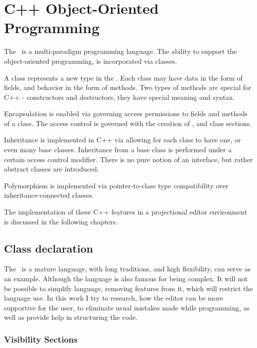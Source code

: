 \chapter{C++ Object-Oriented Programming}

The \cpppl\ is a multi-paradigm programming language. The ability to support the object-oriented programming,
is incorporated via classes. 

A class represents a new type in the \cpppl. Each class may have data in the 
form of fields, and behavior in the form of methods. Two types of methods are special for
C++ - constructors and destructors, they have special meaning and syntax.

Encapsulation is enabled via governing access permissions to fields and methods of a class.
The access control is governed with the creation of ,  and 
class sections.

Inheritance is implemented in C++ via allowing for each class to have one, or even many base classes.
Inheritance from a base class is performed under a certain access control modifier. There is no pure notion 
of an interface, but rather abstract classes are introduced.

Polymorphism is implemented via pointer-to-class type compatibility over inheritance-connected classes.

The implementation of these C++ features in a projectional editor environment is discussed in the
following chapters.


\section{Class declaration}
\label{section:classes}




The \cpppl\ is a mature language, with long traditions, and high flexibility, \cite{alexandrescu} can serve as an example. 
Although the language is also famous for being complex. It will not be possible to simplify language, removing features from 
it, which will restrict the language use. In this work I try to research, how the editor can be more supportive for the user,
to eliminate usual mistakes made while programming, as well as provide help in structuring the code.


\subsection{Visibility Sections}
\label{visibilitysections}



